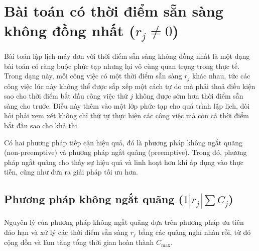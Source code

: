 \documentclass[12pt,a4paper]{report}
\begin{document}
\section{Bài toán có thời điểm sẵn sàng không đồng nhất ($r_j \neq 0$)}
Bài toán lập lịch máy đơn với thời điểm sẵn sàng không đồng nhất là một dạng bài toán có ràng buộc phức tạp nhưng lại vô cùng quan trọng trong thực tế. Trong dạng này, mỗi công việc có một thời điểm sẵn sàng $r_j$ khác nhau, tức các công việc lúc này không thể được sắp xếp một cách tự do mà phải thoả điều kiện sao cho thời điểm bắt đầu công việc thứ $j$ không được sớm hơn thời điểm sẵn sàng cho trước. Điều này thêm vào một lớp phức tạp cho quá trình lập lịch, đòi hỏi phải xem xét không chỉ thứ tự thực hiện các công việc mà còn cả thời điểm bắt đầu sao cho khả thi.

Có hai phương pháp tiếp cận hiệu quả, đó là phương pháp không ngắt quãng (non-preemptive) và phương pháp ngắt quãng (preemptive). Trong đó, phương pháp ngắt quãng cho thấy sự hiệu quả và linh hoạt hơn khi áp dụng vào thực tiễn, cũng như đưa ra giải pháp tối ưu hơn.

\subsection{Phương pháp không ngắt quãng ($1 | r_j | \sum C_j$)}
Nguyên lý của phương pháp không ngắt quãng dựa trên phương pháp ưu tiên đáo hạn và xử lý các thời điểm sẵn sàng $r_j$ bằng các quãng nghỉ nhàn rỗi, từ đó cộng dồn và làm tăng tổng thời gian hoàn thành $C_{\max}$.
\end{document}
